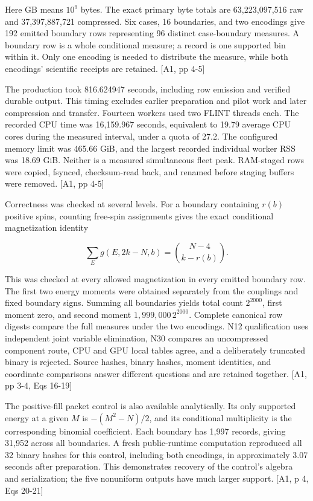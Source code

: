 Here GB means \(10^9\) bytes. The exact primary byte totals are 63,223,097,516 raw and 37,397,887,721 compressed. Six cases, 16 boundaries, and two encodings give 192 emitted boundary rows representing 96 distinct case-boundary measures. A boundary row is a whole conditional measure; a record is one supported bin within it. Only one encoding is needed to distribute the measure, while both encodings' scientific receipts are retained. {[}A1, pp 4-5{]}

The production took 816.624947 seconds, including row emission and verified durable output. This timing excludes earlier preparation and pilot work and later compression and transfer. Fourteen workers used two FLINT threads each. The recorded CPU time was 16,159.967 seconds, equivalent to 19.79 average CPU cores during the measured interval, under a quota of 27.2. The configured memory limit was 465.66 GiB, and the largest recorded individual worker RSS was 18.69 GiB. Neither is a measured simultaneous fleet peak. RAM-staged rows were copied, fsynced, checksum-read back, and renamed before staging buffers were removed. {[}A1, pp 4-5{]}

Correctness was checked at several levels. For a boundary containing \(r(b)\) positive spins, counting free-spin assignments gives the exact conditional magnetization identity

\[\sum_E g(E,2k-N,b)=\binom{N-4}{k-r(b)}.\]

This was checked at every allowed magnetization in every emitted boundary row. The first two energy moments were obtained separately from the couplings and fixed boundary signs. Summing all boundaries yields total count \(2^{2000}\), first moment zero, and second moment \(1,999,000\,2^{2000}\). Complete canonical row digests compare the full measures under the two encodings. N12 qualification uses independent joint variable elimination, N30 compares an uncompressed component route, CPU and GPU local tables agree, and a deliberately truncated binary is rejected. Source hashes, binary hashes, moment identities, and coordinate comparisons answer different questions and are retained together. {[}A1, pp 3-4, Eqs 16-19{]}

The positive-fill packet control is also available analytically. Its only supported energy at a given \(M\) is \(-(M^2-N)/2\), and its conditional multiplicity is the corresponding binomial coefficient. Each boundary has 1,997 records, giving 31,952 across all boundaries. A fresh public-runtime computation reproduced all 32 binary hashes for this control, including both encodings, in approximately 3.07 seconds after preparation. This demonstrates recovery of the control's algebra and serialization; the five nonuniform outputs have much larger support. {[}A1, p 4, Eqs 20-21{]}

